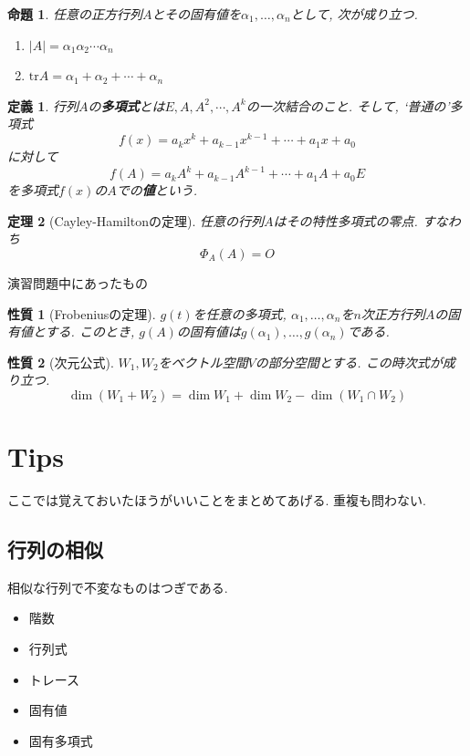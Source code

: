 \documentclass[a4j,dvipdfmx]{jsarticle}
\newcommand{\tr}{\mathrm{tr}}
\newcommand{\Slash}{\hrulefill 演習問題中にあったもの \hrulefill}
\theoremstyle{mystyle}
\newtheorem*{definition}{定義}
\newtheorem{theorem}{定理}[section]
\newtheorem{proposition}[theorem]{命題}
\newtheorem*{property}{性質}
\begin{document}
    \begin{proposition}
        任意の正方行列$A$とその固有値を$\alpha_1,\dots,\alpha_n$として, 次が成り立つ.
        \begin{enumerate}
            \item $|A|=\alpha_1\alpha_2\cdots\alpha_n$
            \item $\tr A=\alpha_1+\alpha_2+\cdots+\alpha_n$
        \end{enumerate}
    \end{proposition}
    \begin{definition}
        行列$A$の\textbf{多項式}とは$E,A,A^2,\cdots,A^k$の一次結合のこと. そして, `普通の'多項式
        \begin{equation*}
            f(x)=a_{k}x^k+a_{k-1}x^{k-1}+\cdots+a_{1}x+a_{0}
        \end{equation*}
        に対して
        \begin{equation*}
            f(A)=a_{k}A^k+a_{k-1}A^{k-1}+\cdots+a_{1}A+a_{0}E
        \end{equation*}
        を多項式$f(x)$の$A$での\textbf{値}という.
    \end{definition}
    \begin{theorem}[Cayley-Hamiltonの定理]
        任意の行列$A$はその特性多項式の零点. すなわち
        \begin{equation*}
            \Phi_A(A)=O
        \end{equation*}
    \end{theorem}
    \Slash
    \begin{property}[Frobeniusの定理]
        $g(t)$を任意の多項式, $\alpha_1,\dots,\alpha_n$を$n$次正方行列$A$の固有値とする. このとき, $g(A)$の固有値は$g(\alpha_1),\dots,g(\alpha_n)$である.
    \end{property}
    \begin{property}[次元公式]
        $W_1,W_2$をベクトル空間$V$の部分空間とする. この時次式が成り立つ.
        \begin{equation*}
            \dim(W_1+W_2)=\dim W_1+\dim W_2 - \dim(W_1\cap W_2)
        \end{equation*}
    \end{property}
    \clearpage
    \section{Tips}
        ここでは覚えておいたほうがいいことをまとめてあげる. 重複も問わない.
        \subsection{行列の相似}
            相似な行列で不変なものはつぎである.
            \begin{itemize}
                \item 階数
                \item 行列式
                \item トレース
                \item 固有値
                \item 固有多項式
            \end{itemize}
\end{document}
